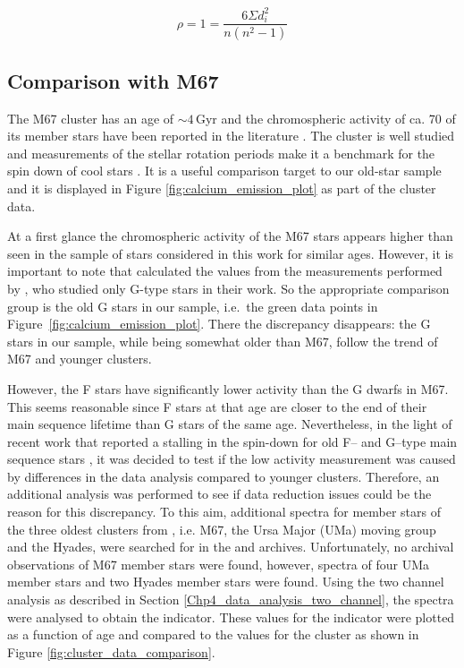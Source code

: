 \begin{equation}
    \rho = 1 = \frac{6\Sigma d_{i}^{2}}{n(n^{2}-1)}
    \label{Eq:spearman_rank_coeff}
\end{equation}

\subsection{Comparison with M67}
The M67 cluster has an age of $\sim 4$\,Gyr \citep{Demarque_etal_1992,VandenBerg_Stetson_2004,Bellini_etal_2010} and the chromospheric activity of ca. 70 of its member stars have been reported in the literature \citep{Giampapa_etal_2006,Mamajek_Hillenbrand_2008}. The cluster is well studied and measurements of the stellar rotation periods make it a benchmark for the spin down of cool stars \citep{Barnes_etal_2016}. It is a useful comparison target to our old-star sample and it is displayed in Figure \ref{fig:calcium_emission_plot} as part of the \citet{Mamajek_Hillenbrand_2008} cluster data.

At a first glance the chromospheric activity of the M67 stars appears higher than seen in the sample of stars considered in this work for similar ages. However, it is important to note that \citealt{Mamajek_Hillenbrand_2008} calculated the \Rprime values from the measurements performed by \citealt{Giampapa_etal_2006}, who studied only G-type stars in their work. So the appropriate comparison group is the old G stars in our sample, i.e.\ the green data points in Figure~\ref{fig:calcium_emission_plot}. There the discrepancy disappears: the G stars in our sample, while being somewhat older than M67, follow the trend of M67 and younger clusters.

However, the F stars have significantly lower activity than the G dwarfs in M67. This seems reasonable since F stars at that age are closer to the end of their main sequence lifetime than G stars of the same age. Nevertheless, in the light of recent work that reported a stalling in the spin-down for old F-- and G--type main sequence stars \citep{van_Saders_etal_2016}, it was decided to test if the low activity measurement was caused by differences in the data analysis compared to younger clusters. Therefore, an additional analysis was performed to see if data reduction issues could be the reason for this discrepancy. To this aim, additional spectra for member stars of the three oldest clusters from \citet{Mamajek_Hillenbrand_2008}, i.e. M67, the Ursa Major (UMa) moving group and the Hyades, were searched for in the \esp and \narval archives. Unfortunately, no archival observations of M67 member stars were found, however, spectra of four UMa member stars and two Hyades member stars were found. Using the two channel analysis as described in Section \ref{Chp4_data_analysis_two_channel}, the spectra were analysed to obtain the \Rprime indicator. These values for the \Rprime indicator were plotted as a function of age and compared to the \citet{Mamajek_Hillenbrand_2008} values for the cluster as shown in Figure \ref{fig:cluster_data_comparison}. 

